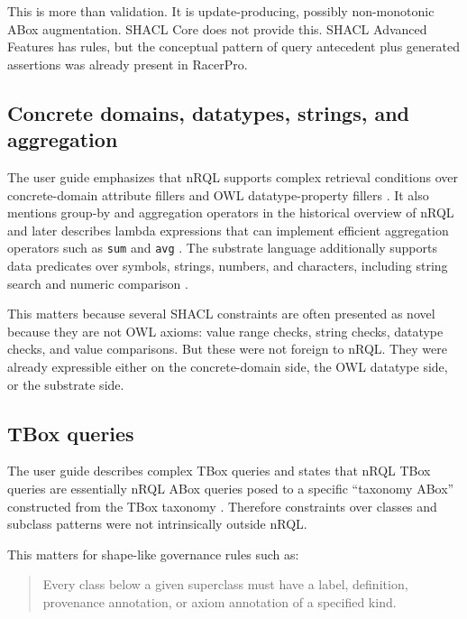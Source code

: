 \documentclass[11pt,letterpaper]{article}
\newcommand{\nrql}{nRQL}
\newcommand{\racer}{RacerPro}
\newcommand{\shacl}{SHACL}
\newcommand{\abox}{ABox}
\newcommand{\tbox}{TBox}
\newcommand{\owl}{OWL}
\begin{document}
This is more than validation. It is update-producing, possibly non-monotonic \abox{} augmentation. \shacl{} Core does not provide this. \shacl{} Advanced Features has rules, but the conceptual pattern of query antecedent plus generated assertions was already present in \racer{}.

\subsection{Concrete domains, datatypes, strings, and aggregation}

The user guide emphasizes that \nrql{} supports complex retrieval conditions over concrete-domain attribute fillers and \owl{} datatype-property fillers \cite[pp.~82--83]{racerug}. It also mentions group-by and aggregation operators in the historical overview of \nrql{} \cite[p.~4]{racerug} and later describes lambda expressions that can implement efficient aggregation operators such as \texttt{sum} and \texttt{avg} \cite[p.~83]{racerug}. The substrate language additionally supports data predicates over symbols, strings, numbers, and characters, including string search and numeric comparison \cite[pp.~136--137,155--156]{racerug}.

This matters because several \shacl{} constraints are often presented as novel because they are not \owl{} axioms: value range checks, string checks, datatype checks, and value comparisons. But these were not foreign to \nrql{}. They were already expressible either on the concrete-domain side, the \owl{} datatype side, or the substrate side.

\subsection{TBox queries}

The user guide describes complex \tbox{} queries and states that \nrql{} \tbox{} queries are essentially \nrql{} \abox{} queries posed to a specific ``taxonomy \abox{}'' constructed from the \tbox{} taxonomy \cite[p.~132]{racerug}. Therefore constraints over classes and subclass patterns were not intrinsically outside \nrql{}.

This matters for shape-like governance rules such as:

\begin{quote}
Every class below a given superclass must have a label, definition, provenance annotation, or axiom annotation of a specified kind.
\end{quote}
\end{document}
